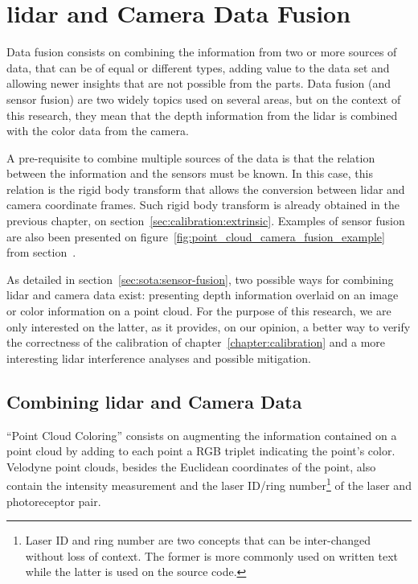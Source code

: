 \chapter{\ac{lidar} and Camera Data Fusion}
\label{chapter:sensor-fusion}

Data fusion consists on combining the information from two or more sources of data, that can be of equal or different types, adding value to the data set and allowing newer insights that are not possible from the parts. Data fusion (and sensor fusion) are two widely topics used on several areas, but on the context of this research, they mean that the depth information from the \ac{lidar} is combined with the color data from the camera.

A pre-requisite to combine multiple sources of the data is that the relation between the information and the sensors must be known. In this case, this relation is the rigid body transform that allows the conversion between \ac{lidar} and camera coordinate frames. Such rigid body transform is already obtained in the previous chapter, on section~\ref{sec:calibration:extrinsic}. Examples of sensor fusion are also been presented on figure~\ref{fig:point_cloud_camera_fusion_example} from section~.

As detailed in section~\ref{sec:sota:sensor-fusion}, two possible ways for combining \ac{lidar} and camera data exist: presenting depth information overlaid on an image or color information on a point cloud. For the purpose of this research, we are only interested on the latter, as it provides, on our opinion, a better way to verify the correctness of the calibration of chapter~\ref{chapter:calibration} and a more interesting \ac{lidar} interference analyses and possible mitigation.

\section{Combining \ac{lidar} and Camera Data}
``Point Cloud Coloring'' consists on augmenting the information contained on a point cloud by adding to each point a RGB triplet indicating the point's color. Velodyne point clouds, besides the Euclidean coordinates of the point, also contain the intensity measurement and the laser ID/ring number\footnote{Laser ID and ring number are two concepts that can be inter-changed without loss of context. The former is more commonly used on written text while the latter is used on the source code.} of the laser and photoreceptor pair.

